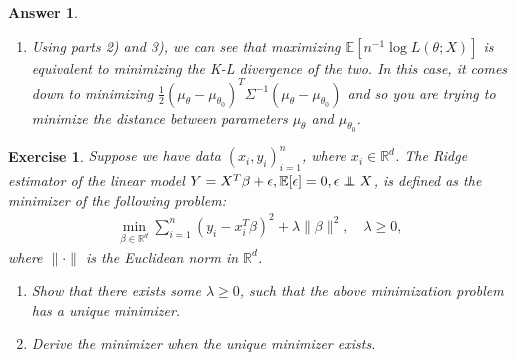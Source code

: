 \documentclass[12pt]{article}
\newcommand\independent{\protect\mathpalette{\protect\independenT}{\perp}}
\def\independenT#1#2{\mathrel{\rlap{$#1#2$}\mkern2mu{#1#2}}}
\theoremstyle{colon}
\newtheorem{exercise}{Exercise}
\newtheorem*{answer}{Answer}
\begin{document}
\begin{answer}
\begin{enumerate}[label=\arabic*)]
\begin{gather*}
        = -\frac{1}{2} \left( \text{tr}(\Sigma \Sigma^{-1}) - \mathbb{E}\left[(x + \mu_1 - \mu_1 - \mu_2)^T \Sigma^{-1} (x + \mu_1 - \mu_1 - \mu_2) \right] \right) \\
        = -\frac{1}{2} \Big( \text{tr}(I_d) - \mathbb{E}\left[(\mu_1 - \mu_2)^T \Sigma^{-1} (\mu_1 - \mu_2) \right] \\
        - \mathbb{E}\left[\text{tr}((x - \mu_2)^T \Sigma^{-1} (x - \mu_2)) \right] \Big) \\
        = -\frac{1}{2} \left( d - (\mu_1 - \mu_2)^T \Sigma^{-1} (\mu_1 - \mu_2) - \mathbb{E}\left[\text{tr}((x - \mu_2)^T (x - \mu_2)\Sigma^{-1}) \right] \right) \\
        = -\frac{1}{2} \left( d - (\mu_1 - \mu_2)^T \Sigma^{-1} (\mu_1 - \mu_2) -\text{tr}(\Sigma \Sigma^{-1}) \right) \\
        = \frac{1}{2} (\mu_1 - \mu_2)^T \Sigma^{-1} (\mu_1 - \mu_2)
      \end{gather*}
    \item Using parts 2) and 3), we can see that maximizing $\mathbb{E}[n^{-1} \log L(\theta; X)]$ is equivalent to minimizing the K-L divergence of the two. In this case, it comes down to minimizing $\frac{1}{2} (\mu_\theta - \mu_{\theta_0})^T \Sigma^{-1} (\mu_\theta - \mu_{\theta_0})$ and so you are trying to minimize the distance between parameters $\mu_\theta$ and $\mu_{\theta_0}$.
  \end{enumerate}
\end{answer}

\clearpage

\begin{exercise}
  Suppose we have data $(x_i, y_i)_{i=1}^n$, where $x_i \in \mathbb{R}^d$. The Ridge estimator of the linear model $Y = X^T \beta + \epsilon, \mathbb{E}[\epsilon] = 0, \epsilon \independent  X$, is defined as the minimizer of the following problem:
  \begin{gather*}
    \min_{\beta \in \mathbb{R}^d} \sum_{i=1}^n (y_i - x_i^T \beta)^2 + \lambda \lVert \beta \rVert^2, \quad \lambda \geq 0,
  \end{gather*}
  where $\lVert \cdot \rVert$ is the Euclidean norm in $\mathbb{R}^d$.
  \begin{enumerate}[label=\arabic*)]
    \item Show that there exists some $\lambda \geq 0$, such that the above minimization problem has a unique minimizer.
    \item Derive the minimizer when the unique minimizer exists.
  \end{enumerate}
\end{exercise}
\end{document}

